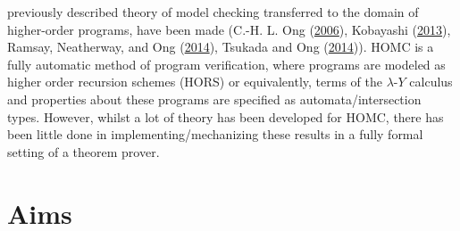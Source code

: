 \documentclass[a4paper, 12pt, twoside]{style/ociamthesis}
\theoremstyle{plain}
\theoremstyle{definition}
\theoremstyle{remark}
\newcommand{\lamy}{\lambda\text{-}Y}
\begin{document}
previously described theory of model checking transferred to the domain
of higher-order programs, have been made (C.-H. L. Ong
(\protect\hyperlink{ref-ong06}{2006}), Kobayashi
(\protect\hyperlink{ref-kobayashi13}{2013}), Ramsay, Neatherway, and Ong
(\protect\hyperlink{ref-ramsay14}{2014}), Tsukada and Ong
(\protect\hyperlink{ref-tsukada14}{2014})). HOMC is a fully automatic
method of program verification, where programs are modeled as higher
order recursion schemes (HORS) or equivalently, terms of the \(\lamy\)
calculus and properties about these programs are specified as
automata/intersection types. However, whilst a lot of theory has been
developed for HOMC, there has been little done in
implementing/mechanizing these results in a fully formal setting of a
theorem prover.

\section{Aims}\label{aims}
\end{document}
